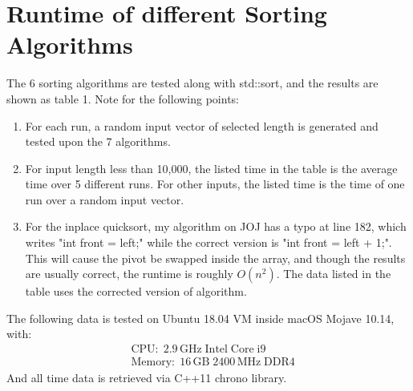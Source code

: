 \documentclass[a4paper]{article}
\begin{document}
\section{Runtime of different Sorting Algorithms}
    \par{} The 6 sorting algorithms are tested along with std::sort\(\), and the results are shown as table 1. Note for the following points:
    \begin{enumerate}
        \item For each run, a random input vector of selected length is generated and tested upon the 7 algorithms.
        \item For input length less than 10,000, the listed time in the table is the average time over 5 different runs. For other inputs, the listed time is the time of one run over a random input vector.
        \item For the inplace quicksort, my algorithm on JOJ has a typo at line 182, which writes "int front = left;" while the correct version is "int front = left + 1;". This will cause the pivot be swapped inside the array, and though the results are usually correct, the runtime is roughly $O\left(n^2\right)$. The data listed in the table uses the corrected version of algorithm.
    \end{enumerate}
    The following data is tested on Ubuntu 18.04 VM inside macOS Mojave 10.14, with:
    \begin{equation*}
        \begin{aligned}
        &\mathrm{CPU:\;2.9\,GHz\;Intel\;Core\;i9}\\
        &\mathrm{Memory:\;16\,GB\;2400\,MHz\;DDR4}
        \end{aligned}
    \end{equation*}
    And all time data is retrieved via C++11 chrono library.
\end{document}
